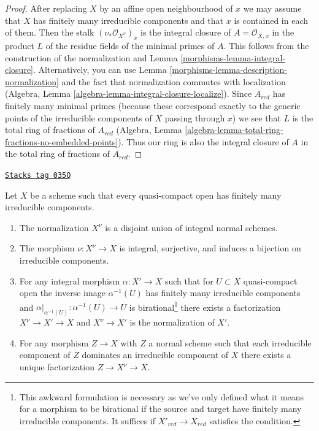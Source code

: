 \begin{proof}

After replacing $X$ by an affine open neighbourhood
of $x$ we may assume that $X$ has finitely many irreducible
components and that $x$ is contained in each of them.
Then the stalk $(\nu_*\mathcal{O}_{X^\nu})_x$ is the
integral closure of $A = \mathcal{O}_{X, x}$ in the product $L$
of the residue fields of the minimal primes of $A$.
This follows from the construction of the normalization and
Lemma \ref{morphisms-lemma-integral-closure}.
Alternatively, you can use Lemma
\ref{morphisms-lemma-description-normalization}
and the fact that normalization commutes with localization
(Algebra, Lemma \ref{algebra-lemma-integral-closure-localize}).
Since $A_{red}$ has finitely many minimal primes
(because these correspond exactly to the generic points
of the irreducible components of $X$ passing through $x$)
we see that $L$ is the total ring of fractions of $A_{red}$
(Algebra, Lemma \ref{algebra-lemma-total-ring-fractions-no-embedded-points}).
Thus our ring is also the integral closure of $A$ in the total
ring of fractions of $A_{red}$.
\end{proof}

\begin{lemma}
\label{morphisms-lemma-normalization-normal}
\href{https://stacks.math.columbia.edu/tag/035Q}{\texttt{Stacks tag 035Q}}

Let $X$ be a scheme such that every quasi-compact open has
finitely many irreducible components.
\begin{enumerate}
\item The normalization $X^\nu$ is a disjoint union of integral normal schemes.
\item The morphism $\nu : X^\nu \to X$ is integral, surjective, and
induces a bijection on irreducible components.
\item For any integral morphism $\alpha : X' \to X$ such that for
$U \subset X$ quasi-compact open the inverse image $\alpha^{-1}(U)$ has
finitely many irreducible components and
$\alpha|_{\alpha^{-1}(U)} : \alpha^{-1}(U) \to U$ is birational\footnote{This
awkward formulation is necessary as we've only defined what
it means for a morphism to be birational if the source and target
have finitely many irreducible components. It suffices if
$X'_{red} \to X_{red}$ satisfies the condition.}
there exists a factorization
$X^\nu \to X' \to X$ and $X^\nu \to X'$ is the normalization of $X'$.
\item For any morphism $Z \to X$ with $Z$ a normal scheme
such that each irreducible component of $Z$ dominates an irreducible
component of $X$ there exists a unique factorization $Z \to X^\nu \to X$.
\end{enumerate}
\end{lemma}

